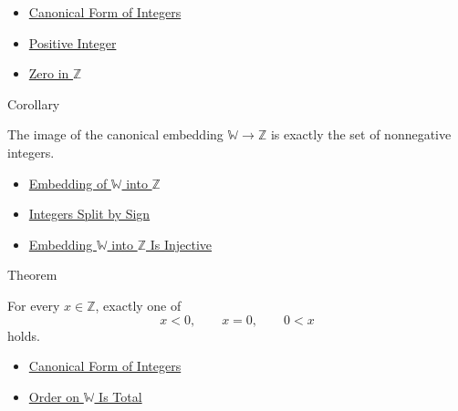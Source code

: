 \begin{dependencies}
\begin{itemize}
  \item \hyperref[thm:canonical-form-of-integers]{Canonical Form of Integers}
  \item \hyperref[def:positive-integer]{Positive Integer}
  \item \hyperref[def:zero-in-z]{Zero in $\mathbb{Z}$}
\end{itemize}
\end{dependencies}

\begin{corollarybox}{Corollary}
\begin{corollary}
\label{cor:image-of-embedding-is-nonnegatives}
The image of the canonical embedding $\mathbb{W}\to\mathbb{Z}$ is exactly
the set of nonnegative integers.
\end{corollary}
\end{corollarybox}

\begin{dependencies}
\begin{itemize}
  \item \hyperref[def:canonical-embedding-w-into-z]{Embedding of $\mathbb{W}$ into $\mathbb{Z}$}
  \item \hyperref[cor:integers-split-by-sign]{Integers Split by Sign}
  \item \hyperref[thm:embedding-w-into-z-injective]{Embedding $\mathbb{W}$ into $\mathbb{Z}$ Is Injective}
\end{itemize}
\end{dependencies}

\begin{theorembox}{Theorem}
\begin{theorem}
\label{thm:sign-trichotomy-on-z}
For every $x\in\mathbb{Z}$, exactly one of
\[
x<0,\qquad x=0,\qquad 0<x
\]
holds.
\end{theorem}
\end{theorembox}

\begin{dependencies}
\begin{itemize}
  \item \hyperref[thm:canonical-form-of-integers]{Canonical Form of Integers}
  \item \hyperref[thm:order-on-w-total]{Order on $\mathbb{W}$ Is Total}
\end{itemize}
\end{dependencies}

